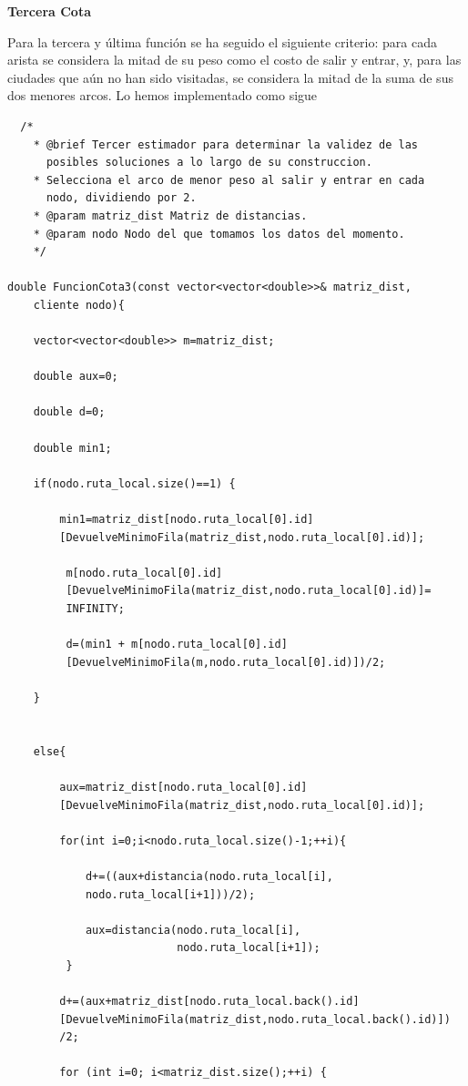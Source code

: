 \documentclass[a4paper,12pt,twoside]{article} %
\begin{document}
\newpage
\textbf{Tercera Cota}

Para la tercera y última función se ha seguido el siguiente criterio: para cada arista se considera la mitad de su peso como el costo de salir y entrar, y, para las ciudades que aún no han sido visitadas, se considera la mitad de la suma de sus dos menores arcos. Lo hemos implementado como sigue

\lstset{language=C++}
\begin{lstlisting}
  /*
    * @brief Tercer estimador para determinar la validez de las
      posibles soluciones a lo largo de su construccion.
    * Selecciona el arco de menor peso al salir y entrar en cada 
      nodo, dividiendo por 2.
    * @param matriz_dist Matriz de distancias.
    * @param nodo Nodo del que tomamos los datos del momento.
    */

double FuncionCota3(const vector<vector<double>>& matriz_dist,
    cliente nodo){

    vector<vector<double>> m=matriz_dist;

    double aux=0;
    
    double d=0;
    
    double min1;

    if(nodo.ruta_local.size()==1) {

        min1=matriz_dist[nodo.ruta_local[0].id]
        [DevuelveMinimoFila(matriz_dist,nodo.ruta_local[0].id)];

         m[nodo.ruta_local[0].id]
         [DevuelveMinimoFila(matriz_dist,nodo.ruta_local[0].id)]=
         INFINITY;

         d=(min1 + m[nodo.ruta_local[0].id]
         [DevuelveMinimoFila(m,nodo.ruta_local[0].id)])/2;

    }


    else{

        aux=matriz_dist[nodo.ruta_local[0].id]
        [DevuelveMinimoFila(matriz_dist,nodo.ruta_local[0].id)];

        for(int i=0;i<nodo.ruta_local.size()-1;++i){

            d+=((aux+distancia(nodo.ruta_local[i],
            nodo.ruta_local[i+1]))/2);

            aux=distancia(nodo.ruta_local[i],
                          nodo.ruta_local[i+1]);
         }

        d+=(aux+matriz_dist[nodo.ruta_local.back().id]
        [DevuelveMinimoFila(matriz_dist,nodo.ruta_local.back().id)])
        /2;

        for (int i=0; i<matriz_dist.size();++i) {


\end{lstlisting}
\end{document}

